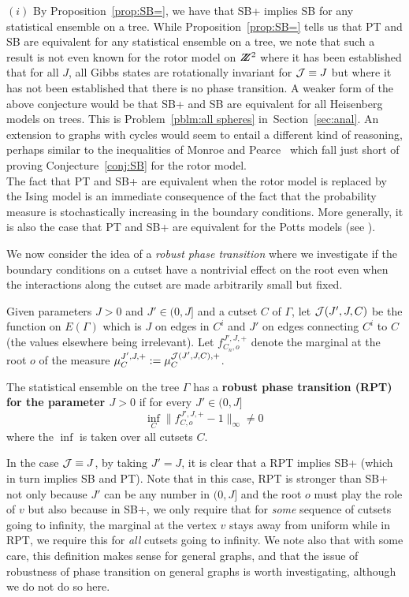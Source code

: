  $(i)$ By Proposition~\ref{prop:SB=}, we have that 
SB+ implies SB for any statistical ensemble on a tree.  While 
Proposition~\ref{prop:SB=} tells us that PT and SB are equivalent for any
statistical ensemble
on a tree, we note that such a result is not even known for the rotor model
on $Z\!\!\!Z^2$ where it has been established that for all
$J$, all Gibbs states are rotationally invariant for ${\cal J}\equiv J$
but where it has not been established that there is no phase transition. 
A weaker form of the above conjecture would be that SB+ and SB are 
equivalent for all Heisenberg models on trees.  This is
Problem~\ref{pblm:all spheres} in~Section~\ref{sec:anal}.
An extension to graphs with cycles would seem to entail a different kind
of reasoning, perhaps similar to the inequalities of Monroe and 
Pearce~\cite{MP} which fall just short of proving
Conjecture~\ref{conj:SB} for the rotor model. \\
 The fact that PT and SB+ 
are equivalent when the rotor model is replaced by the Ising model 
is an immediate consequence of the fact that the probability measure is 
stochastically increasing in the boundary conditions. More generally,
it is also the case that PT and SB+ are equivalent for the Potts models
(see \cite{ACCN}).

We now consider the idea of a {\it robust phase transition} where we 
investigate if the boundary conditions on a cutset have a nontrivial effect
on the root even when the interactions along the cutset are made
arbitrarily small but fixed.

Given parameters $J>0$ and $J' \in (0,J]$ and
a cutset $C$ of $\Gamma$, let $ {\cal J} ( J', J , C)$ be the function 
on $E(\Gamma)$ which is $J$ on edges in $C^i$ and
$J'$ on edges connecting $C^i$ to $C$ (the values elsewhere being
irrelevant).  
Let $f^{J',J , +}_{C_n , o}$ denote the marginal at the root $o$ of the
measure $\mu^{J',J, +}_C:=\mu^{{\cal J} (J', J , C) , +}_C$.

\begin{defn} \label{defn:robustPT}
The statistical ensemble on the tree $\Gamma$ has a {\bf robust phase 
transition (RPT) for the parameter $J>0$} if for every $J'\in (0,J]$
$$
\inf_C \|f^{J',J , +}_{C , o} - 1\|_\infty \neq 0 \, 
$$
where the $\inf$ is taken over all cutsets $C$.
\end{defn}

In the case ${\cal J} \equiv J$, by taking $J'=J$, it is clear
that a RPT implies SB+ (which in turn implies SB and PT).  Note that
in this case, RPT is
stronger than SB+ not only because $J'$ can be any number in $(0,J]$
and the root $o$ must play the role of $v$
but also because in SB+, we only require that for {\it some} sequence
of cutsets going to infinity, the marginal at the vertex $v$ stays away from
uniform while in RPT, we require this for {\it all} cutsets going to
infinity.
We note also that with some care, this definition makes sense for general 
graphs, and that the issue of robustness of phase transition on general graphs
is worth investigating, although we do not do so here.

